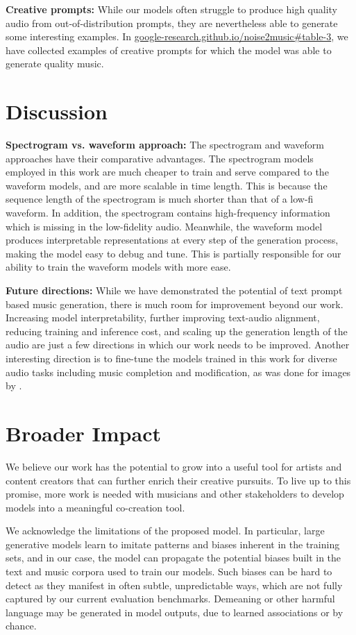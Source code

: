 \documentclass[nohyperref]{article}
\newcommand{\website}{https://google-research.github.io/noise2music}
\newcommand{\websiteDisplay}{google-research.github.io/noise2music}
\theoremstyle{plain}
\theoremstyle{definition}
\theoremstyle{remark}
\begin{document}
\textbf{Creative prompts:} While our models often struggle to produce high quality audio from out-of-distribution prompts, they are nevertheless able to generate some interesting examples. In \href{\website#table-3}{\websiteDisplay\#table-3}, we have collected examples of creative prompts for which the model was able to generate quality music.


\section{Discussion}

\textbf{Spectrogram vs. waveform approach:} The spectrogram and waveform approaches have their comparative advantages. The spectrogram models employed in this work are much cheaper to train and serve compared to the waveform models, and are more scalable in time length. This is because the sequence length of the spectrogram is much shorter than that of a low-fi waveform. In addition, the spectrogram contains high-frequency information which is missing in the low-fidelity audio. Meanwhile, the waveform model produces interpretable representations at every step of the generation process, making the model easy to debug and tune. This is partially responsible for our ability to train the waveform models with more ease.

\textbf{Future directions:} While we have demonstrated the potential of text prompt based music generation, there is much room for improvement beyond our work. Increasing model interpretability, further improving text-audio alignment, reducing training and inference cost, and scaling up the generation length of the audio are just a few directions in which our work needs to be improved. Another interesting direction is to fine-tune the models trained in this work for diverse audio tasks including music completion and modification, as was done for images by \citet{saharia2022palette}.

\section{Broader Impact}

We believe our work has the potential to grow into a useful tool for artists and content creators that can further enrich their creative pursuits. To live up to this promise, more work is needed with musicians and other stakeholders to develop models into a meaningful co-creation tool. 

We acknowledge the limitations of the proposed model. In particular, large generative models learn to imitate patterns and biases inherent in the training sets, and in our case, the model can propagate the potential biases built in the text and music corpora used to train our models. Such biases can be hard to detect as they manifest in often subtle, unpredictable ways, which are not fully captured by our current evaluation benchmarks. Demeaning or other harmful language may be generated in model outputs, due to learned associations or by chance.
\end{document}
